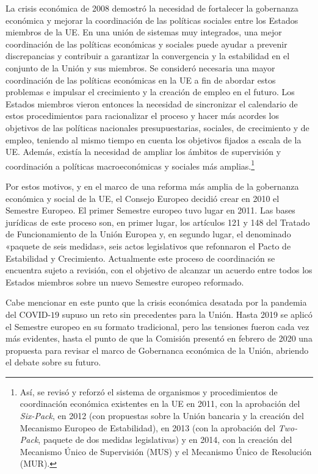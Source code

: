 \documentclass[10pt,a4paper]{article}
\begin{document}
La crisis económica de 2008 demostró la necesidad de fortalecer la gobernanza económica y mejorar la coordinación de las políticas sociales entre los Estados miembros de la UE. En una unión de sistemas muy integrados, una mejor coordinación de las políticas económicas y sociales puede ayudar a prevenir discrepancias y contribuir a garantizar la convergencia y la estabilidad en el conjunto de la Unión y sus miembros. Se consideró necesaria una mayor coordinación de las políticas económicas en la UE a fin de abordar estos problemas e impulsar el crecimiento y la creación de empleo en el futuro. Los Estados miembros vieron entonces la necesidad de sincronizar el calendario de estos procedimientos para racionalizar el proceso y hacer más acordes los objetivos de las políticas nacionales presupuestarias, sociales, de crecimiento y de empleo, teniendo al mismo tiempo en cuenta los objetivos fijados a escala de la UE. Además, existía la necesidad de ampliar los ámbitos de supervisión y coordinación a políticas macroeconómicas y sociales más amplias.\footnote{%
    Así, se revisó y reforzó el sistema de organismos y procedimientos de coordinación económica existentes en la UE en 2011, con la aprobación del \textit{Six-Pack}, en 2012 (con propuestas sobre la Unión bancaria y la creación del Mecanismo Europeo de Estabilidad), en 2013 (con la aprobación del \textit{Two-Pack}, paquete de dos medidas legislativas) y en 2014, con la creación del Mecanismo Único de Supervisión (MUS) y el Mecanismo Único de Resolución (MUR).
}

Por estos motivos, y en el marco de una reforma más amplia de la gobernanza económica y social de la UE, el Consejo Europeo decidió crear en 2010 el Semestre Europeo. El primer Semestre europeo tuvo lugar en 2011. Las bases jurídicas de este proceso son, en primer lugar, los artículos 121 y 148 del Tratado de Funcionamiento de la Unión Europea y, en segundo lugar, el denominado «paquete de seis medidas», seis actos legislativos que refonnaron el Pacto de Estabilidad y Crecimiento. Actualmente este proceso de coordinación se encuentra sujeto a revisión, con el objetivo de alcanzar un acuerdo entre todos los Estados miembros sobre un nuevo Semestre europeo reformado.

Cabe mencionar en este punto que la crisis económica desatada por la pandemia del COVID-$19$ supuso un reto sin precedentes para la Unión. Hasta 2019 se aplicó el Semestre europeo en su formato tradicional, pero las tensiones fueron cada vez más evidentes, hasta el punto de que la Comisión presentó en febrero de 2020 una propuesta para revisar el marco de Gobernanca económica de la Unión, abriendo el debate sobre su futuro. 
\end{document}
